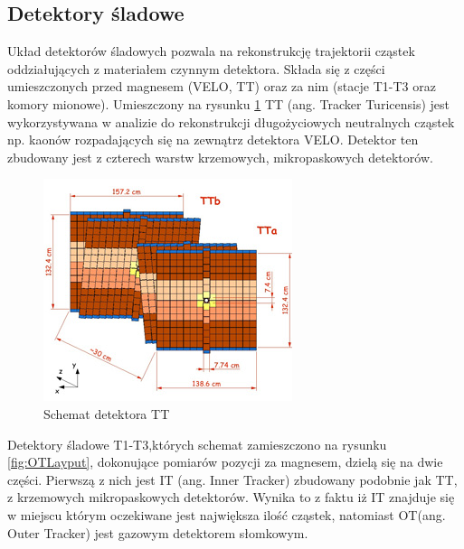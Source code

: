 \subsection{Detektory śladowe}
Układ detektorów śladowych pozwala na rekonstrukcję trajektorii cząstek oddziałujących z materiałem czynnym detektora. Składa się z części umieszczonych przed magnesem (VELO, TT) oraz za nim (stacje T1-T3 oraz komory mionowe). Umieszczony na rysunku \ref{fig:TTlayout} TT (ang. Tracker Turicensis) jest wykorzystywana w analizie do rekonstrukcji długożyciowych neutralnych cząstek np. kaonów rozpadających się na zewnątrz detektora VELO. Detektor ten zbudowany jest z czterech warstw krzemowych, mikropaskowych detektorów. 
\begin{figure}[th]
  \centering
  \includegraphics[scale=1]{rozdzial2/TT-layout.jpg}
  \caption{Schemat detektora TT \cite{public}}
  \label{fig:TTlayout}
\end{figure}
Detektory śladowe T1-T3,których schemat zamieszczono na rysunku \ref{fig:OTLayput},  dokonujące pomiarów pozycji za magnesem, dzielą się na dwie części. Pierwszą z nich jest IT (ang. Inner Tracker) zbudowany podobnie jak TT, z krzemowych mikropaskowych detektorów. Wynika to z faktu iż IT znajduje się w miejscu którym oczekiwane jest największa ilość cząstek, natomiast OT(ang. Outer Tracker) jest gazowym detektorem słomkowym.


